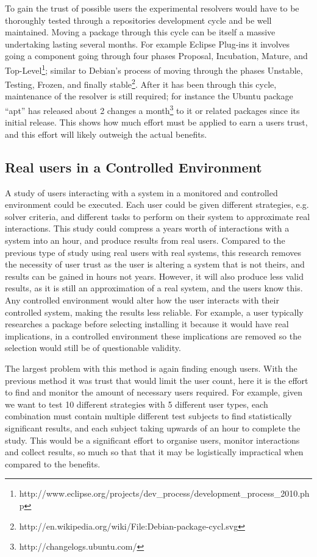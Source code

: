 To gain the trust of possible users the experimental resolvers would have to be thoroughly tested through a repositories development cycle and be well maintained.
Moving a package through this cycle can be itself a massive undertaking lasting several months. 
For example Eclipse Plug-ins it involves going a component going through four phases 
Proposal, Incubation, Mature, and Top-Level\footnote{http://www.eclipse.org/projects/dev\_process/development\_process\_2010.php};
similar to Debian's process of moving through the phases Unstable, Testing, Frozen, and finally stable\footnote{http://en.wikipedia.org/wiki/File:Debian-package-cycl.svg}.
After it has been through this cycle, maintenance of the resolver is still required; 
for instance the Ubuntu package ``apt'' has released about 2 changes a month\footnote{http://changelogs.ubuntu.com/} to it or related packages since its initial release.
This shows how much effort must be applied to earn a users trust, and this effort will likely outweigh the actual benefits.

\subsection{Real users in a Controlled Environment}
A study of users interacting with a system in a monitored and controlled environment could be executed.
Each user could be given different strategies, e.g. solver criteria, and different tasks to perform on their system to approximate real interactions.
This study could compress a years worth of interactions with a system into an hour, and produce results from real users. 
Compared to the previous type of study using real users with real systems,
this research removes the necessity of user trust as the user is altering a system that is not theirs,
and results can be gained in hours not years. 
However, it will also produce less valid results, as it is still an approximation of a real system, and the users know this.
Any controlled environment would alter how the user interacts with their controlled system, making the results less reliable.
For example, a user typically researches a package before selecting installing it because it would have real implications, 
in a controlled environment these implications are removed so the selection would still be of questionable validity.

The largest problem with this method is again finding enough users.
With the previous method it was trust that would limit the user count, here it is the effort to find and monitor the amount of necessary users required.
For example, given we want to test 10 different strategies with 5 different user types, each combination must contain multiple different test subjects to find statistically significant results, 
and each subject taking upwards of an hour to complete the study. 
This would be a significant effort to organise users, monitor interactions and collect results, so much so that that it may be logistically impractical when compared to the benefits.


